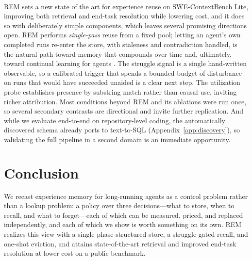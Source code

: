 \documentclass{article}
\newcommand{\sysname}{REM}
\begin{document}
\paragraph{}\sysname{} sets a new state of the art for experience reuse on SWE-ContextBench Lite, improving both retrieval and end-task resolution while lowering cost, and it does so with deliberately simple components, which leaves several promising directions open. \sysname{} performs \emph{single-pass} reuse from a fixed pool; letting an agent's own completed runs re-enter the store, with staleness and contradiction handled, is the natural path toward memory that compounds over time and, ultimately, toward continual learning for agents \citep{hu2026continual}. The struggle signal is a single hand-written observable, so a calibrated trigger that spends a bounded budget of disturbance on runs that would have succeeded unaided is a clear next step.  The utilization probe establishes presence by substring match rather than causal use, inviting richer attribution. Most conditions beyond \sysname{} and its ablations were run once, so several secondary contrasts are directional and invite further replication.  And while we evaluate end-to-end on repository-level coding, the automatically discovered schema already ports to text-to-SQL (Appendix~\ref{app:discovery}), so validating the full pipeline in a second domain is an immediate opportunity.

\section{Conclusion}
\label{sec:conclusion}

We recast experience memory for long-running agents as a control problem rather than a lookup problem: a policy over three decisions---what to store, when to recall, and what to forget---each of which can be measured, priced, and replaced independently, and each of which we show is worth something on its own. \sysname{} realizes this view with a single phase-structured store, a struggle-gated recall, and one-shot eviction, and attains state-of-the-art retrieval and improved end-task resolution at lower cost on a public benchmark.
\end{document}
